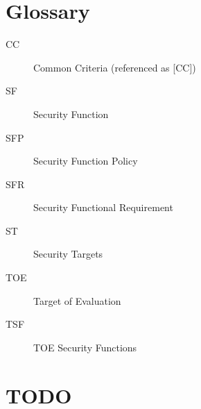 \documentclass[10pt,a4paper,english]{book}
\begin{document}
\chapter{Glossary}
\begin{description}
\item[CC]

Common Criteria (referenced as {[}CC])

\item[SF]

Security Function

\item[SFP]

Security Function Policy

\item[SFR]

Security Functional Requirement

\item[ST]

Security Targets

\item[TOE]

Target of Evaluation

\item[TSF]

TOE Security Functions

\end{description}



\hypertarget{todo}{}
\chapter{TODO}


\end{document}
